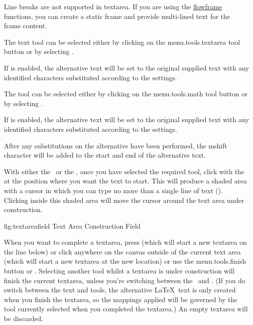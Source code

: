 Line breaks are not supported in \gls{textarea}. If you are using
the \hyperref[sec:flowframe]{flowframe} functions, you can create a
static frame and provide multi-lined text for the frame content.


The text tool can be selected either by clicking on the
\gls{menu.tools.textarea} tool button or by selecting .

If  is enabled, the alternative text will be set
to the original supplied text with any identified characters
substituted according to the  settings.


The  tool can be selected either by clicking on the
\gls{menu.tools.math} tool button or by selecting .

If  is enabled, the alternative text will be set
to the original supplied text with any identified characters
substituted according to the  settings.

After any substitutions on the alternative have been performed, 
the \gls{mshift} character will be added to the start and end
of the alternative text.


With either the \texttool\ or the \mathstool,
once you have selected the required tool, click with the
 at the position where
you want the text to start. This will produce a shaded area with a
cursor in which you can type no more than a single line of text
().
Clicking inside this shaded area will move the cursor around the
text area under construction.

\FloatFig
  {fig:textareafield}
  {}
  {Text Area Construction Field}

When you want to complete a \gls{textarea}, press
 (which will start a new
\gls{textarea} on the line below) or click anywhere on the canvas
outside of the current text area (which will start a new
\gls{textarea} at the new location) or use the
\gls{menu.tools.finish} button or .  Selecting
another tool whilst a \gls{textarea} is under construction will
finish the current \gls{textarea}, unless you're switching between
the \texttool\ and \mathstool.  (If you do switch between the
text and  tools, the alternative \LaTeX\ text is only
created when you finish the \gls*{textarea}, so the mappings applied
will be governed by the tool currently selected when you completed
the \gls*{textarea}.) An empty \gls{textarea} will be discarded.

